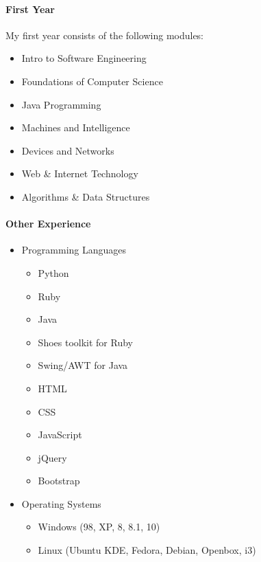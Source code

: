\documentclass{article}
\begin{document}
\paragraph{First Year}
My first year consists of the following modules:
\begin{multicols}{2}
\begin{itemize}
  \item Intro to Software Engineering
  \item Foundations of Computer Science
  \item Java Programming
  \item Machines and Intelligence
  \item Devices and Networks
  \item Web \& Internet Technology
  \item Algorithms \& Data Structures
\end{itemize}
\end{multicols}
\paragraph{Other Experience}
\begin{itemize}
	\item Programming Languages
	\begin{multicols}{2}
	\begin{itemize}
	\item Python
	\item Ruby
	\item Java
	\item Shoes toolkit for Ruby
	\item Swing/AWT for Java
	\item HTML
	\item CSS
	\item JavaScript
	\item jQuery
	\item Bootstrap
	\end{itemize}
	\end{multicols}
	\end{itemize}
\begin{itemize}
	\item Operating Systems 
		\begin{itemize}
			\item Windows (98, XP, 8, 8.1, 10)
			\item Linux (Ubuntu KDE, Fedora, Debian, Openbox, i3)
		\end{itemize}
\end{itemize}
\end{document}
